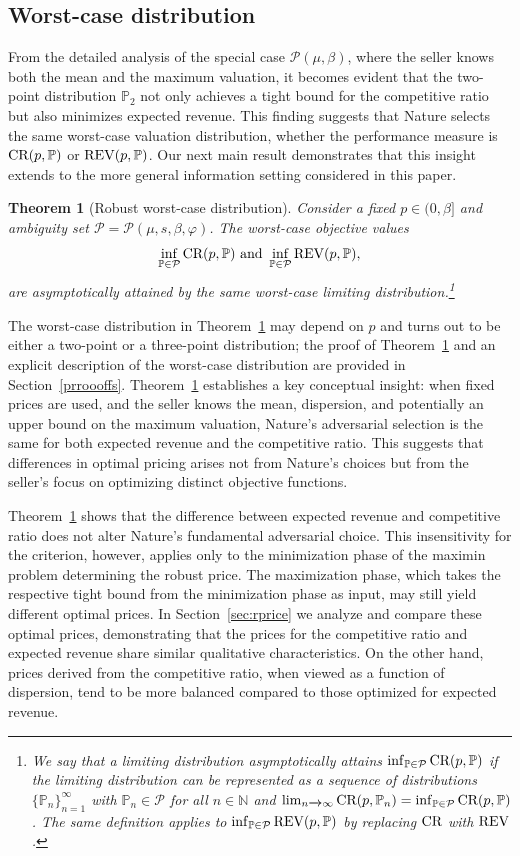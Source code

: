 \documentclass[11pt]{article}
\newtheorem{theorem}{Theorem}[section]
\newcommand{\bP}{\mathbb{P}}
\newcommand{\cP}{\mathcal{P}}
\newcommand{\1}{\mathds{1}}
\begin{document}
\subsection{Worst-case distribution}\label{mainthr2}
From the detailed analysis of the special case $\cP(\mu,\beta)$, where the seller knows both the mean and the maximum valuation, it becomes evident that the two-point distribution $\bP_2$ not only achieves a tight bound for the competitive ratio but also minimizes expected revenue. This finding suggests that Nature selects the same worst-case valuation distribution, whether the performance measure is $\textup{CR}(p,\bP)$ or $\textup{REV}(p,\bP)$. Our next main result demonstrates that this insight extends to the more general information setting considered in this paper.
\begin{theorem}[Robust worst-case distribution]\label{thm22}
Consider a fixed $p\in(0,\beta]$ and ambiguity set $\cP = \cP(\mu,s,\beta,\varphi)$.
The worst-case objective values
$$\inf_{\bP \in \cP}\textup{CR}(p,\bP) \text{ and } \inf_{\bP \in \cP}\textup{REV}(p,\bP),$$ are asymptotically attained by the same worst-case limiting distribution.\footnote{We say that a limiting distribution asymptotically attains $\inf_{\bP \in \cP}\textup{CR}(p,\bP)$ if the limiting distribution can be represented as a sequence of distributions $\{\bP_n\}_{n=1}^\infty$ with $\bP_n\in\cP$ for all $n\in\mathbb{N}$ and $\lim_{n\xrightarrow{}\infty}\textup{CR}(p,\bP_n)=\inf_{\bP\in\cP}\textup{CR}(p,\bP)$. The same definition applies to $\inf_{\bP\in\cP}\textup{REV}(p,\bP)$ by replacing $\textup{CR}$ with $\textup{REV}$.}
\end{theorem}

The worst-case distribution in Theorem~\ref{thm22} may depend on $p$ and turns out to be either a two-point or a three-point distribution; the proof of Theorem~\ref{thm22} and an explicit description of the worst-case distribution are provided in  Section~\ref{prroooffs}. 
Theorem~\ref{thm22} establishes a key conceptual insight: when fixed prices are used, and the seller knows the mean, dispersion, and potentially an upper bound on the maximum valuation, Nature's adversarial selection is the same for both expected revenue and the competitive ratio. This suggests that differences in optimal pricing arises not from Nature’s choices but from the seller’s focus on optimizing distinct objective functions.

Theorem~\ref{thm22} shows that the difference between expected revenue and competitive ratio does not alter Nature's fundamental adversarial choice. This insensitivity for the criterion, however, applies only to the minimization phase of the maximin problem determining the robust price. The maximization phase, which takes the respective tight bound from the minimization phase as input, may still yield different optimal prices. In Section~\ref{sec:rprice}  we analyze and compare these optimal prices, demonstrating that the prices for the competitive ratio and expected revenue share similar qualitative characteristics. On the other hand, prices derived from the competitive ratio, when viewed as a function of dispersion, tend to be more balanced compared to those optimized for expected revenue.
\end{document}

